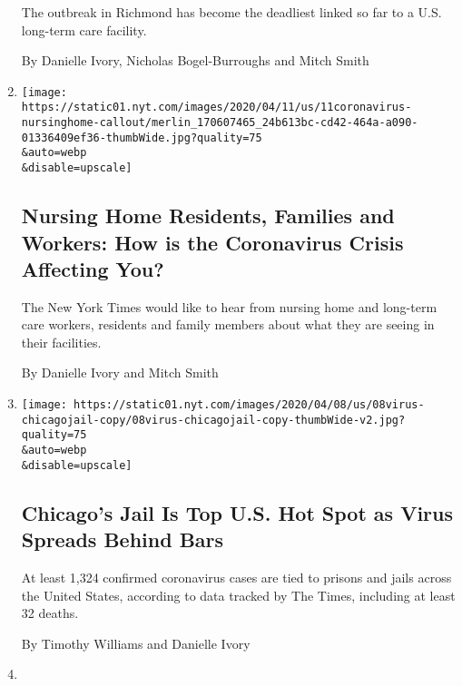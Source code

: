 \begin{enumerate}
  The outbreak in Richmond has become the deadliest linked so far to a
  U.S. long-term care facility.

  By Danielle Ivory, Nicholas Bogel-Burroughs and Mitch Smith
\item
  \href{/2020/04/11/business/nursing-home-callout.html}{}

  \texttt{[image: https://static01.nyt.com/images/2020/04/11/us/11coronavirus-nursinghome-callout/merlin\_170607465\_24b613bc-cd42-464a-a090-01336409ef36-thumbWide.jpg?quality=75\\\&auto=webp\\\&disable=upscale]}

  \hypertarget{nursing-home-residents-families-and-workers-how-is-the-coronavirus-crisis-affecting-you}{%
  \subsection{Nursing Home Residents, Families and Workers: How is the
  Coronavirus Crisis Affecting
  You?}\label{nursing-home-residents-families-and-workers-how-is-the-coronavirus-crisis-affecting-you}}

  The New York Times would like to hear from nursing home and long-term
  care workers, residents and family members about what they are seeing
  in their facilities.

  By Danielle Ivory and Mitch Smith
\item
  \href{/2020/04/08/us/coronavirus-cook-county-jail-chicago.html}{}

  \texttt{[image: https://static01.nyt.com/images/2020/04/08/us/08virus-chicagojail-copy/08virus-chicagojail-copy-thumbWide-v2.jpg?quality=75\\\&auto=webp\\\&disable=upscale]}

  \hypertarget{chicagos-jail-is-top-us-hot-spot-as-virus-spreads-behind-bars}{%
  \subsection{Chicago's Jail Is Top U.S. Hot Spot as Virus Spreads
  Behind
  Bars}\label{chicagos-jail-is-top-us-hot-spot-as-virus-spreads-behind-bars}}

  At least 1,324 confirmed coronavirus cases are tied to prisons and
  jails across the United States, according to data tracked by The
  Times, including at least 32 deaths.

  By Timothy Williams and Danielle Ivory
\item
  \href{/live/2020/coronavirus-covid-19-03-18/social-distancing-isnt-an-option-when-it-comes-to-prisons}{}


\end{enumerate}
